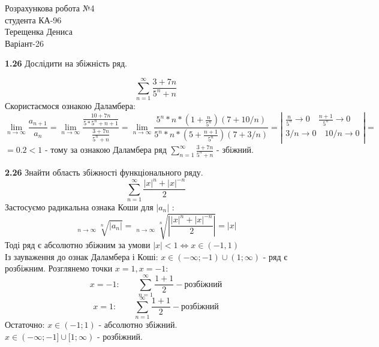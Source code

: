 \documentclass[14pt,a4paper]{scrartcl}
\theoremstyle{definition}
\newtheorem{defo}{Означення}[section]
\theoremstyle{remark}
\theoremstyle{definition}
\theoremstyle{definition}
\DeclareMathOperator*\uplim{\overline{lim}}
\begin{document}
\def\be{\begin{equation}}
\def\ee{\end{equation}}

\def\bd{\begin{defo}}
\def\ed{\end{defo}}

\def\bbt{\begin{boxteo}}
\def\ebt{\end{boxteo}}
\begin{center}
  Розрахункова робота №4\\
  студента КА-96\\
  Терещенка Дениса\\
  Варіант-26\\
\end{center}

\textbf{1.26} Дослідити на збіжність ряд.

$$  \sum\limits_{n = 1}^{ \infty}{ \frac{3 + 7n}{5^n+n} } $$
Скористаємося ознакою Даламбера: $$ \lim\limits_{n\to  \infty}{ \frac{a_{n+1}}{a_n} } =  \lim\limits_{n\to  \infty}{ \frac{  \frac{10 + 7n}{5*5^n + n + 1}  }{ \frac{3 + 7n}{5^n+n}  } } =
 \lim\limits_{n\to  \infty}{
  \frac{5^n*n*(1 + \frac{n}{5^n} )(7+10/n)}{5^n*n*(5 + \frac{n+1}{5^n} )(7 + 3/n) }
} = \left| \begin{gathered}
  \frac{n}{5^n} \to 0 \quad \frac{n+1}{5^n} \to 0\\
  3/n \to 0 \quad 10/n \to 0\\
\end{gathered} \right| =
 $$
 $
= 0.2 < 1
 $  - тому за ознакою Даламбера ряд $ \sum\limits_{n = 1}^{ \infty}{\frac{3 + 7n}{5^n+n} }$ - збіжний.


\textbf{2.26} Знайти область збіжності функціонального ряду.\\
$$  \sum\limits_{n = 1}^{ \infty}{\frac{\left| x \right|^n  + \left| x \right|^{-n}} {2}} $$
Застосуємо радикальна ознака Коши для $\left| a_n \right|$ :\\
$$
 \uplim\limits_{n\to  \infty}{ \sqrt[n] { \left| a_n \right|  }} =
  \uplim\limits_{n\to  \infty}{ \sqrt[n]{ \left| \frac{\left| x \right|^n  + \left| x \right|^{-n}} {2} \right|  } } = \left| x \right|
$$
Тоді ряд є абсолютно збіжним за умови $ \left| x \right| < 1  \Leftrightarrow x \in (-1, 1)$
\\
Із зауваження до ознак Даламбера і Коші: $ x \in (- \infty; -1) \cup (1; \infty)$ - ряд є розбіжним. Розглянемо точки $x=1, x= -1:$
$$
x=-1 : \qquad  \sum\limits_{n = 1}^{ \infty}{ \frac{1+1}{2} } - \text{розбіжний}
$$
$$
x=1 : \qquad  \sum\limits_{n = 1}^{ \infty}{ \frac{1+1}{2} } - \text{розбіжний}
$$
Остаточно: $x \in (-1; 1) $ - абсолютно збіжний. \\
$ x \in (- \infty; -1] \cup [1; \infty)$ - розбіжний.\\
\end{document}
